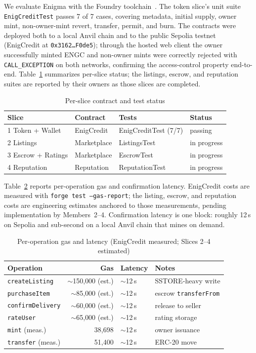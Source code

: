 We evaluate Enigma with the Foundry toolchain~\cite{foundry}. The token slice's unit suite \texttt{EnigCreditTest} passes 7 of 7 cases, covering metadata, initial supply, owner mint, non-owner-mint revert, transfer, permit, and burn. The contracts were deployed both to a local Anvil chain and to the public Sepolia testnet (EnigCredit at \texttt{0x3162{\ldots}F0de5}); through the hosted web client the owner successfully minted ENGC and non-owner mints were correctly rejected with \texttt{CALL\_EXCEPTION} on both networks, confirming the access-control property end-to-end. Table~\ref{tab:status} summarizes per-slice status; the listings, escrow, and reputation suites are reported by their owners as those slices are completed.

\begin{table}[t]
\caption{Per-slice contract and test status}
\label{tab:status}
\centering
\small
\begin{tabular}{@{}llll@{}}
\toprule
Slice & Contract & Tests & Status \\
\midrule
1 Token + Wallet  & EnigCredit  & EnigCreditTest (7/7) & passing \\
2 Listings        & Marketplace & ListingsTest         & in progress \\
3 Escrow + Ratings& Marketplace & EscrowTest           & in progress \\
4 Reputation      & Reputation  & ReputationTest       & in progress \\
\bottomrule
\end{tabular}
\end{table}


\noindent Table~\ref{tab:gas} reports per-operation gas and confirmation latency. EnigCredit costs are measured with \texttt{forge test --gas-report}; the listing, escrow, and reputation costs are engineering estimates anchored to those measurements, pending implementation by Members~2--4. Confirmation latency is one block: roughly 12\,s on Sepolia and sub-second on a local Anvil chain that mines on demand.

\begin{table}[t]
\caption{Per-operation gas and latency (EnigCredit measured; Slices 2--4 estimated)}
\label{tab:gas}
\centering
\small
\begin{tabular}{@{}lrll@{}}
\toprule
Operation & Gas & Latency & Notes \\
\midrule
\texttt{createListing}   & $\sim$150{,}000 (est.) & $\sim$12\,s & SSTORE-heavy write \\
\texttt{purchaseItem}    & $\sim$85{,}000 (est.)  & $\sim$12\,s & escrow \texttt{transferFrom} \\
\texttt{confirmDelivery} & $\sim$60{,}000 (est.)  & $\sim$12\,s & release to seller \\
\texttt{rateUser}        & $\sim$65{,}000 (est.)  & $\sim$12\,s & rating storage \\
\midrule
\texttt{mint} (meas.)     & 38{,}698 & $\sim$12\,s & owner issuance \\
\texttt{transfer} (meas.) & 51{,}400 & $\sim$12\,s & ERC-20 move \\
\bottomrule
\end{tabular}
\end{table}
